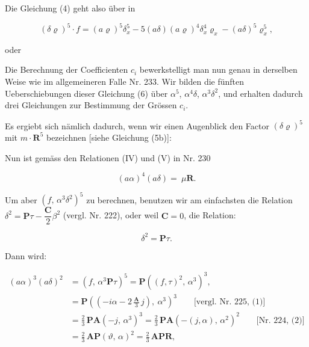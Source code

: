 Die Gleichung (4) geht also über in

\[
(\delta\varrho)^5\cdot f = (a\varrho)^5\delta_x^5 - 5(a\delta)(a\varrho)^4\delta_x^4\varrho_x - (a\delta)^5\varrho_x^5,
\]

oder



Die Berechnung der Coefficienten $c_i$ bewerkstelligt man nun genau
in derselben Weise wie im allgemeineren Falle Nr. 233. Wir bilden
die fünften Ueberschiebungen dieser Gleichung (6) über $\alpha^5$, $\alpha^4\delta$, $\alpha^3\delta^2$,
und erhalten dadurch drei Gleichungen zur Bestimmung der Grössen $c_i$.

Es ergiebt sich nämlich dadurch, wenn wir einen Augenblick den
Factor $(\delta\varrho)^5$ mit $m\cdot\mathbf{R}^5$ bezeichnen [siehe Gleichung (5b)]:


Nun ist gemäss den Relationen (IV) und (V) in Nr. 230


\[
(a\alpha)^4(a\delta) = \ \mu\mathbf{R}.
\]

Um aber $(f,\,\alpha^3\delta^2)^5$ zu berechnen, benutzen wir am einfachsten
die Relation $\delta^2 = \mathbf{P}\tau - \dfrac{\mathbf{C}}{2}\beta^2$ (vergl. Nr. 222), oder weil $\mathbf{C} = 0$, die
Relation:

\[
\delta^2 = \mathbf{P}\tau.
\]

Dann wird:

\[
\begin{aligned}
(a\alpha)^3(a\delta)^2 &= (f,\,\alpha^3\mathbf{P}\tau)^5 = \mathbf{P}((f,\tau)^2,\,\alpha^3)^3,\\
&= \mathbf{P}\left(\left(-i\alpha - 2\,\frac{\mathbf{A}}{3}\,j\right),\ \alpha^3\right)^3 \qquad \text{[vergl. Nr. 225, (1)]}\\
&= \frac23\,\mathbf{P}\mathbf{A}(-j,\,\alpha^3)^3 = \frac23\,\mathbf{P}\mathbf{A}(-(j,\alpha),\,\alpha^2)^2 \qquad \text{[Nr. 224, (2)]}\\
&= \frac23\,\mathbf{A}\mathbf{P}(\vartheta,\,\alpha)^2 = \frac23\,\mathbf{A}\mathbf{P}\mathbf{R},
\end{aligned}
\]

